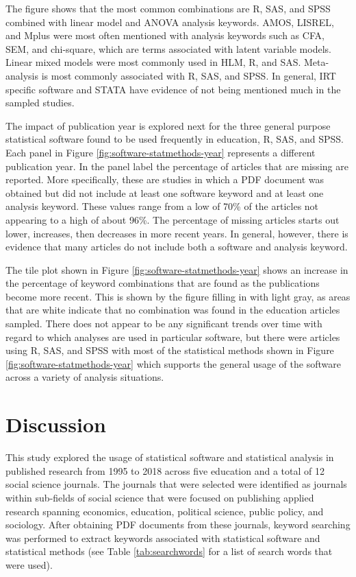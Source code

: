 \documentclass[
  english,
  ,man]{apa6}
\begin{document}
The figure shows that the most common combinations are R, SAS, and SPSS combined with linear model and ANOVA analysis keywords. AMOS, LISREL, and Mplus were most often mentioned with analysis keywords such as CFA, SEM, and chi-square, which are terms associated with latent variable models. Linear mixed models were most commonly used in HLM, R, and SAS. Meta-analysis is most commonly associated with R, SAS, and SPSS. In general, IRT specific software and STATA have evidence of not being mentioned much in the sampled studies.

The impact of publication year is explored next for the three general purpose statistical software found to be used frequently in education, R, SAS, and SPSS. Each panel in Figure \ref{fig:software-statmethods-year} represents a different publication year. In the panel label the percentage of articles that are missing are reported. More specifically, these are studies in which a PDF document was obtained but did not include at least one software keyword and at least one analysis keyword. These values range from a low of 70\% of the articles not appearing to a high of about 96\%. The percentage of missing articles starts out lower, increases, then decreases in more recent years. In general, however, there is evidence that many articles do not include both a software and analysis keyword.

The tile plot shown in Figure \ref{fig:software-statmethods-year} shows an increase in the percentage of keyword combinations that are found as the publications become more recent. This is shown by the figure filling in with light gray, as areas that are white indicate that no combination was found in the education articles sampled. There does not appear to be any significant trends over time with regard to which analyses are used in particular software, but there were articles using R, SAS, and SPSS with most of the statistical methods shown in Figure \ref{fig:software-statmethods-year} which supports the general usage of the software across a variety of analysis situations.

\hypertarget{discussion}{%
\section{Discussion}\label{discussion}}

This study explored the usage of statistical software and statistical analysis in published research from 1995 to 2018 across five education and a total of 12 social science journals. The journals that were selected were identified as journals within sub-fields of social science that were focused on publishing applied research spanning economics, education, political science, public policy, and sociology. After obtaining PDF documents from these journals, keyword searching was performed to extract keywords associated with statistical software and statistical methods (see Table \ref{tab:searchwords} for a list of search words that were used).
\end{document}
